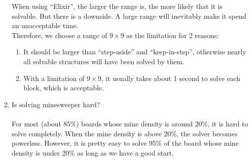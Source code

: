 \documentclass[letter]{article}
\begin{document}
\begin{enumerate}
	When using ``Elixir'', the larger the range is, the more likely that it is solvable. But there is a downside. A large range will inevitably make it spend an unacceptable time. \\
	Therefore, we choose a range of $ 9 \times 9 $ as the limitation for 2 reasons: 
	\begin{enumerate}
		\item {It should be larger than ``step-aside'' and ``keep-in-step'', otherwise nearly all solvable structures will have been solved by them.}
		\item {With a limitation of $ 9 \times 9 $, it usually takes about 1 second to solve each block, which is acceptable.}
	\end{enumerate}

	\item {Is solving minesweeper hard?} \\
	\\
	For most (about 85\%) boards whose mine density is around 20\%, it is hard to solve completely. When the mine density is above 20\%, the solver becomes powerless. However, it is pretty easy to solve 95\% of the board whose mine density is under 20\% as long as we have a good start.
\end{enumerate}
\end{document}
